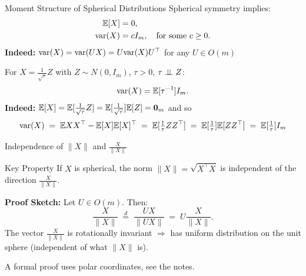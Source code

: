 \documentclass[11pt,handout,aspectratio=169]{beamer}
\begin{document}
\begin{frame}{Moment Structure of Spherical Distributions}
Spherical symmetry implies:
      \begin{align*}
        \mathbb{E}[X] &= 0, \\
        \mathrm{var}(X) &= c I_m, \quad \mbox{for some }c \geq 0.
      \end{align*}  
      \textbf{Indeed:} $\mathrm{var}(X)=\mathrm{var}(UX)=U \mathrm{var}(X)U^\top$ for any $U\in O(m)$ 
\bigskip

For $X = \frac{1}{\sqrt{\tau}} Z$ with $Z \sim N(0, I_m)$, $\tau>0$, $\tau\perp\!\!\! \perp Z$:
      \begin{equation*}
        \mathrm{var}(X) = \mathbb{E}[\tau^{-1}] I_m.
      \end{equation*}
\textbf{Indeed:} $\mathbb E[X]=\mathbb E[\tfrac{1}{\sqrt{\tau}}Z]=\mathbb E[\tfrac{1}{\sqrt{\tau}}]\mathbb E[Z]=\boldsymbol 0_m$ and so 
$$\mathrm{var}(X)\;=\;\mathbb E XX^\top -\mathbb E[X]\mathbb E[X]^\top\;=\;\mathbb E[\tfrac{1}{\tau}ZZ^\top]\;=\;\mathbb E[\tfrac{1}{\tau}]\mathbb E[ZZ^\top]\;=\;\mathbb E[\tfrac{1}{\tau}]I_m$$
\end{frame}

\begin{frame}{Independence of $\|X\|$ and $\frac{X}{\|X\|}$}
\begin{alertblock}{Key Property}
	If $X$ is spherical, the norm $\|X\| = \sqrt{X^\top X}$ is independent of the direction $\frac{X}{\|X\|}$.
\end{alertblock}
  \textbf{Proof Sketch:}
Let $U \in O(m)$. Then:
$$
        \frac{X}{\|X\|} \;\overset{d}{=}\; \frac{UX}{\|UX\|} \;=\; U \frac{X}{\|X\|}.
$$
The vector $\frac{X}{\|X\|}$ is rotationally invariant $\Longrightarrow$ has uniform distribution on the unit sphere (independent of what $\|X\|$ is).
\bigskip

A formal proof uses polar coordinates, see the notes.
\end{frame}

\end{document}
